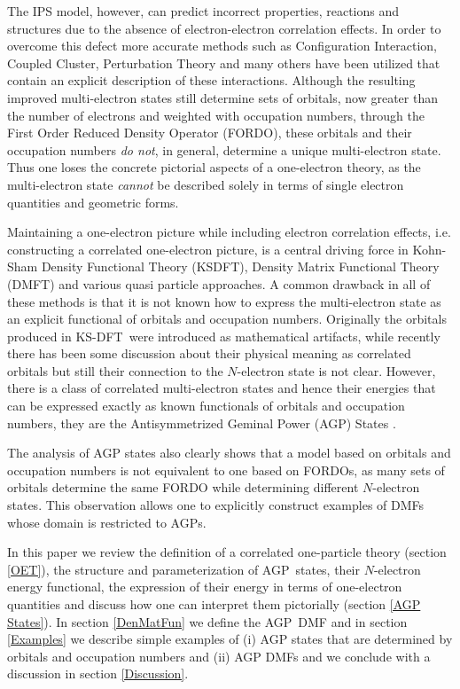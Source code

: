 \documentclass[aps,preprint]{revtex4}%
\begin{document}
The IPS model, however, can predict incorrect properties, reactions and
structures due to the absence of electron-electron correlation effects. In
order to overcome this defect more accurate methods such as Configuration
Interaction, Coupled Cluster, Perturbation Theory and many others have been
utilized that contain an explicit description of these interactions. Although
the resulting improved multi-electron states still determine sets of orbitals,
now greater than the number of electrons and weighted with occupation numbers,
through the First Order Reduced Density Operator (FORDO), these orbitals and
their occupation numbers \emph{do not}, in general, determine a unique
multi-electron state. Thus one loses the concrete pictorial aspects of a
one-electron theory, as the multi-electron state \emph{cannot} be described
solely in terms of single electron quantities and geometric forms.

Maintaining a one-electron picture while including electron correlation
effects, i.e. constructing a correlated one-electron picture, is a central
driving force in Kohn-Sham Density Functional Theory (KSDFT), Density Matrix
Functional Theory (DMFT) and various quasi particle approaches. A common
drawback in all of these methods is that it is not known how to express the
multi-electron state as an explicit functional of orbitals and occupation
numbers. Originally the orbitals produced in KS-DFT\ were introduced as
mathematical artifacts, while recently \cite{Kummel2008} there has been some
discussion about their physical meaning as correlated orbitals but still their
connection to the $N$-electron state is not clear. However, there is a class
of correlated multi-electron states and hence their energies that can be
expressed exactly as known functionals of orbitals and occupation numbers,
they are the Antisymmetrized Geminal Power (AGP) States \cite{OrtizWeiner2006}.

The analysis of AGP states also clearly shows that a model based on orbitals
and occupation numbers is not equivalent to one based on FORDOs, as many sets
of orbitals determine the same FORDO while determining different $N$-electron
states. This observation allows one to explicitly construct examples of DMFs
whose domain is restricted to AGPs.

In this paper we review the definition of a correlated one-particle theory
(section \ref{OET}), the structure and parameterization of AGP\ states, their
$N$-electron energy functional, the expression of their energy in terms of
one-electron quantities and discuss how one can interpret them pictorially
(section \ref{AGP States}). In section \ref{DenMatFun} we define the AGP\ DMF
and in section \ref{Examples} we describe simple examples of (i) AGP states
that are determined by orbitals and occupation numbers and (ii) AGP DMFs and
we conclude with a discussion in section \ref{Discussion}.
\end{document}
